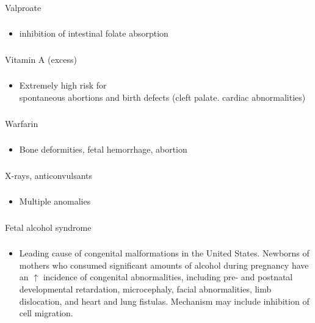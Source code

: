 \documentclass[11pt]{beamer}
\begin{document}
\begin{frame}
 \frametitle{}
Valproate
\end{frame}

\begin{frame}
 \frametitle{}
\begin{itemize}
\item{inhibition of intestinal folate absorption}
\end{itemize}
\end{frame}

\begin{frame}
 \frametitle{}
Vitamin A (excess)
\end{frame}

\begin{frame}
 \frametitle{}
\begin{itemize}
\item{Extremely high risk for \\ spontaneous abortions and birth defects (cleft palate. cardiac abnormalities) }
\end{itemize}
\end{frame}

\begin{frame}
 \frametitle{}
Warfarin
\end{frame}

\begin{frame}
 \frametitle{}
\begin{itemize}
\item{Bone deformities, fetal hemorrhage, abortion}
\end{itemize}
\end{frame}

\begin{frame}
 \frametitle{}
X-rays, anticonvulsants
\end{frame}

\begin{frame}
 \frametitle{}
\begin{itemize}
\item{Multiple anomalies }
\end{itemize}
\end{frame}

\begin{frame}
 \frametitle{}
Fetal alcohol syndrome
\end{frame}

\begin{frame}
 \frametitle{}
\begin{itemize}
\item{Leading cause of congenital malformations in the United States. Newborns of mothers who consumed significant amounts of alcohol during pregnancy have an ${\uparrow}$ incidence of congenital abnormalities, including pre- and postnatal developmental retardation, microcephaly, facial abnormalities, limb dislocation, and heart and lung fistulas. Mechanism may include inhibition of cell migration.}
\end{itemize}
\end{frame}
\end{document}

